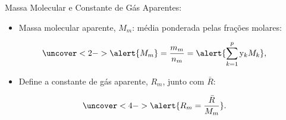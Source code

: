     \begin{frame}{Massa Molecular e Constante de Gás Aparentes:}\vspace*{-2em}
        \begin{itemize}
            \item<1-> Massa molecular aparente, \alert{$M_m$}: média ponderada pelas
                \alert{frações molares}:
        \end{itemize}
        \vspace*{0.8em}\begin{equation*}
            \uncover<2->{
                \alert{M_m} = \frac{m_m}{n_m} = \alert{\sum_{k=1}^p \mathrm{y}_k M_k},
            }
        \end{equation*}
        \begin{itemize}
            \item<3-> Define a constante de gás aparente, \alert{$R_m$}, junto com $\bar{R}$:
        \end{itemize}
        \vspace*{0.8em}\begin{equation*}
            \uncover<4->{
                \alert{R_m = \frac{\bar{R}}{M_m}}.
            }
        \end{equation*}
    \end{frame}

